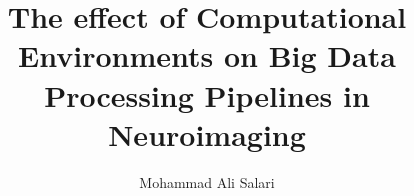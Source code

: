 \author{Mohammad Ali Salari}
\title{The effect of Computational Environments on Big Data Processing Pipelines in Neuroimaging}

\PhD                            %
